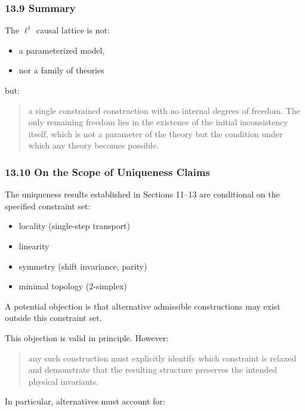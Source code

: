 \documentclass[
]{article}
\providecommand{\tightlist}{%
  \setlength{\itemsep}{0pt}\setlength{\parskip}{0pt}}
\begin{document}
\subsubsection{13.9 Summary}\label{summary}

The \(\ell^1\) causal lattice is not:

\begin{itemize}
\tightlist
\item
  a parameterized model,
\item
  nor a family of theories
\end{itemize}

but:

\begin{quote}
a single constrained construction with no internal degrees of freedom.
The only remaining freedom lies in the existence of the initial
inconsistency itself, which is not a parameter of the theory but the
condition under which any theory becomes possible.
\end{quote}

\subsubsection{13.10 On the Scope of Uniqueness
Claims}\label{on-the-scope-of-uniqueness-claims}

The uniqueness results established in Sections 11--13 are conditional on
the specified constraint set:

\begin{itemize}
\tightlist
\item
  locality (single-step transport)
\item
  linearity
\item
  symmetry (shift invariance, parity)
\item
  minimal topology (2-simplex)
\end{itemize}

A potential objection is that alternative admissible constructions may
exist outside this constraint set.

This objection is valid in principle. However:

\begin{quote}
any such construction must explicitly identify which constraint is
relaxed and demonstrate that the resulting structure preserves the
intended physical invariants.
\end{quote}

In particular, alternatives must account for:
\end{document}
